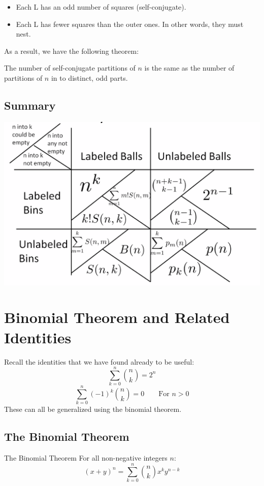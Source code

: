 \documentclass[letterpaper]{article}
\begin{document}
\begin{itemize}
    \item Each L has an odd number of squares (self-conjugate).
    \item Each L has fewer squares than the outer ones. In other words, they must nest. 
\end{itemize}
As a result, we have the following theorem: 
\begin{theorem}{}{}
    The number of self-conjugate partitions of $n$ is the same as the number of partitions of $n$ in to distinct, odd parts. 
\end{theorem}

\subsection{Summary}
\begin{center}
    \includegraphics[scale=0.6]{summary_ballbin.PNG}
\end{center}

\newpage 
\section{Binomial Theorem and Related Identities}
Recall the identities that we have found already to be useful:
\[\sum_{k = 0}^n \binom{n}{k} = 2^n\]
\[\sum_{k = 0}^n (-1)^k \binom{n}{k} = 0 \qquad \text{For } n > 0\]
These can all be generalized using the binomial theorem.

\subsection{The Binomial Theorem}
\begin{theorem}{The Binomial Theorem}{}
    For all non-negative integers $n$:
    \[(x + y)^n = \sum_{k = 0}^n \binom{n}{k} x^k y^{n - k}\]
\end{theorem}
\end{document}
